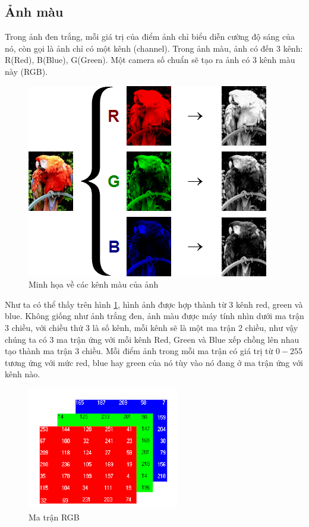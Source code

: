 \documentclass[a4paper]{report}
\begin{document}
\subsection*{Ảnh màu}
Trong ảnh đen trắng, mỗi giá trị của điểm ảnh chỉ biểu diễn cường độ sáng của nó, còn gọi là ảnh chỉ có một kênh (channel). Trong ảnh màu, ảnh có đến 3 kênh: R(Red), B(Blue), G(Green). Một camera số chuẩn sẽ tạo ra ảnh có 3 kênh màu này (RGB).
%
\begin{figure}[H]
\centering
\includegraphics[scale=.6]{../images/fig/color.png}
\caption{Minh họa về các kênh màu của ảnh}
\label{fig:color}
\end{figure}
%
\noindent
Như ta có thể thấy trên hình \ref{fig:color}, hình ảnh được hợp thành từ 3 kênh red, green và blue. Không giống như ảnh trắng đen, ảnh màu được máy tính nhìn dưới ma trận 3 chiều, với chiều thứ 3 là số kênh, mỗi kênh sẽ là một ma trận 2 chiều, như vậy chúng ta có 3 ma trận ứng với mỗi kênh Red, Green và Blue xếp chồng lên nhau tạo thành ma trận 3 chiều. Mỗi điểm ảnh trong mỗi ma trận có giá trị từ $0-255$ tương ứng với mức red, blue hay green của nó tùy vào nó đang ở ma trận ứng với kênh nào.
\begin{figure}[H]
\centering
\includegraphics[scale=.6]{../images/fig/matrix2.png}
\caption{Ma trận RGB}
\label{fig:matrix2}
\end{figure}
\end{document}
